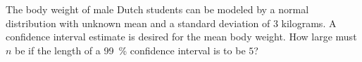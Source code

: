 The body weight of male Dutch students can be modeled by a normal distribution with unknown mean and a standard deviation of $3$ kilograms.
A confidence interval estimate is desired for the mean body weight. 
How large must $n$ be if the length of a \SI{99}{\percent} confidence interval is to be $5$? 